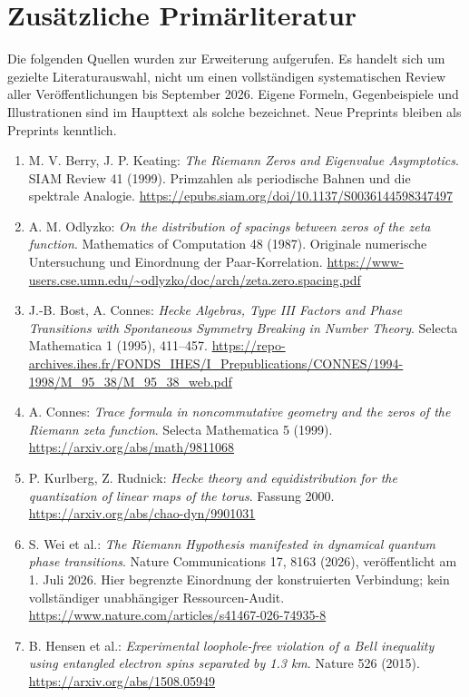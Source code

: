 \section{Zusätzliche Primärliteratur}
Die folgenden Quellen wurden zur Erweiterung aufgerufen. Es handelt sich um gezielte Literaturauswahl, nicht um einen vollständigen systematischen Review aller Veröffentlichungen bis September 2026. Eigene Formeln, Gegenbeispiele und Illustrationen sind im Haupttext als solche bezeichnet. Neue Preprints bleiben als Preprints kenntlich.
\begin{enumerate}[label={F\arabic*.},leftmargin=2.5em,itemsep=7pt,before={\interlinepenalty=10000}]
\item M. V. Berry, J. P. Keating: \emph{The Riemann Zeros and Eigenvalue Asymptotics}. SIAM Review 41 (1999). Primzahlen als periodische Bahnen und die spektrale Analogie. \url{https://epubs.siam.org/doi/10.1137/S0036144598347497}
\item A. M. Odlyzko: \emph{On the distribution of spacings between zeros of the zeta function}. Mathematics of Computation 48 (1987). Originale numerische Untersuchung und Einordnung der Paar-Korrelation. \url{https://www-users.cse.umn.edu/~odlyzko/doc/arch/zeta.zero.spacing.pdf}
\item J.-B. Bost, A. Connes: \emph{Hecke Algebras, Type III Factors and Phase Transitions with Spontaneous Symmetry Breaking in Number Theory}. Selecta Mathematica 1 (1995), 411--457. \url{https://repo-archives.ihes.fr/FONDS_IHES/I_Prepublications/CONNES/1994-1998/M_95_38/M_95_38_web.pdf}
\item A. Connes: \emph{Trace formula in noncommutative geometry and the zeros of the Riemann zeta function}. Selecta Mathematica 5 (1999). \url{https://arxiv.org/abs/math/9811068}
\item P. Kurlberg, Z. Rudnick: \emph{Hecke theory and equidistribution for the quantization of linear maps of the torus}. Fassung 2000. \url{https://arxiv.org/abs/chao-dyn/9901031}
\item S. Wei et al.: \emph{The Riemann Hypothesis manifested in dynamical quantum phase transitions}. Nature Communications 17, 8163 (2026), veröffentlicht am 1. Juli 2026. Hier begrenzte Einordnung der konstruierten Verbindung; kein vollständiger unabhängiger Ressourcen-Audit. \url{https://www.nature.com/articles/s41467-026-74935-8}
\item B. Hensen et al.: \emph{Experimental loophole-free violation of a Bell inequality using entangled electron spins separated by 1.3 km}. Nature 526 (2015). \url{https://arxiv.org/abs/1508.05949}

\end{enumerate}
